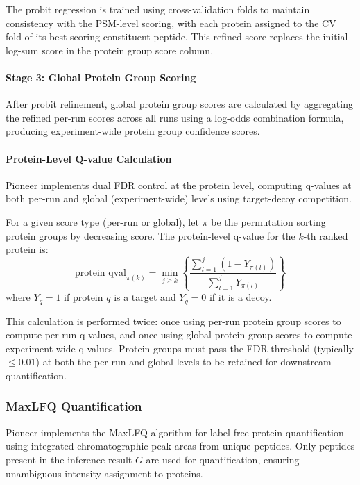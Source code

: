 \documentclass{article}
\begin{document}
The probit regression is trained using cross-validation folds to maintain consistency with the PSM-level scoring, with each protein assigned to the CV fold of its best-scoring constituent peptide. This refined score replaces the initial log-sum score in the protein group score column.

\paragraph{Stage 3: Global Protein Group Scoring} After probit refinement, global protein group scores are calculated by aggregating the refined per-run scores across all runs using a log-odds combination formula, producing experiment-wide protein group confidence scores.

\paragraph{Protein-Level Q-value Calculation} Pioneer implements dual FDR control at the protein level, computing q-values at both per-run and global (experiment-wide) levels using target-decoy competition.

For a given score type (per-run or global), let $\pi$ be the permutation sorting protein groups by decreasing score. The protein-level q-value for the $k$-th ranked protein is:
\begin{equation}
\text{protein\_qval}_{\pi(k)} = \min_{j \geq k} \left\{ \frac{\sum_{l=1}^{j} (1 - Y_{\pi(l)})}{\sum_{l=1}^{j} Y_{\pi(l)}} \right\}
\end{equation}
where $Y_q = 1$ if protein $q$ is a target and $Y_q = 0$ if it is a decoy.

This calculation is performed twice: once using per-run protein group scores to compute per-run q-values, and once using global protein group scores to compute experiment-wide q-values. Protein groups must pass the FDR threshold (typically $\leq 0.01$) at both the per-run and global levels to be retained for downstream quantification.

\subsubsection{MaxLFQ Quantification}

Pioneer implements the MaxLFQ algorithm \cite{Cox2014} for label-free protein quantification using integrated chromatographic peak areas from unique peptides. Only peptides present in the inference result $G$ are used for quantification, ensuring unambiguous intensity assignment to proteins.
\end{document}
